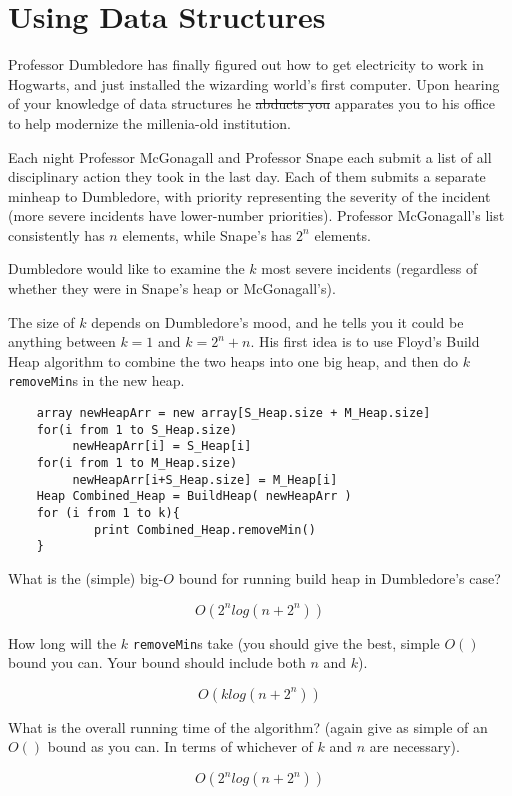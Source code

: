 \documentclass[12pt]{article}
\begin{document}
\section{Using Data Structures}
Professor Dumbledore has finally figured out how to get electricity to work in Hogwarts, and just installed the wizarding world's first computer. Upon hearing of your knowledge of data structures he \sout{abducts you} apparates you to his office to help modernize the millenia-old institution.


Each night Professor McGonagall and Professor Snape each submit a list of all disciplinary action they took in the last day. Each of them submits a separate minheap to Dumbledore, with priority representing the severity of the incident (more severe incidents have lower-number priorities). Professor McGonagall's list consistently has $n$ elements, while Snape's has $2^n$ elements. 

Dumbledore would like to examine the $k$ most severe incidents (regardless of whether they were in Snape's heap or McGonagall's). 

The size of $k$ depends on Dumbledore's mood, and he tells you it could be anything between $k=1$ and $k=2^n+n$. His first idea is to use Floyd's Build Heap algorithm to combine the two heaps into one big heap, and then do $k$ \texttt{removeMin}s in the new heap.  
	\begin{verbatim}
	array newHeapArr = new array[S_Heap.size + M_Heap.size]
	for(i from 1 to S_Heap.size)
	     newHeapArr[i] = S_Heap[i]
	for(i from 1 to M_Heap.size)
	     newHeapArr[i+S_Heap.size] = M_Heap[i]
	Heap Combined_Heap = BuildHeap( newHeapArr )
	for (i from 1 to k){
	     	print Combined_Heap.removeMin()
	}
\end{verbatim}		
\newpage
	What is the (simple) big-$O$ bound for running build heap in Dumbledore's case?
	\begin{tcolorbox}
		$$O(2^nlog(n+2^n))$$
	\end{tcolorbox}
	How long will the $k$ \texttt{removeMin}s take (you should give the best, simple $O()$ bound you can. Your bound should include both $n$ and $k$). 
	\begin{tcolorbox}
		$$O(klog(n+2^n))$$
	\end{tcolorbox}
	What is the overall running time of the algorithm? (again give as simple of an $O()$ bound as you can. In terms of whichever of $k$ and $n$ are necessary).
	\begin{tcolorbox}
		$$O(2^nlog(n+2^n))$$
	\end{tcolorbox}
\end{document}
